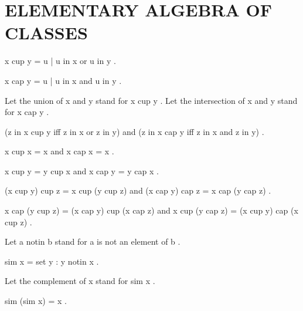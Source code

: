 \documentclass[a4paper,draft]{amsproc}
\begin{document}
\section{ELEMENTARY ALGEBRA OF CLASSES}
\begin{forthel}

\begin{definition} 
 x cup y = {  u | u in x  or  u in y } .
\end{definition}

\begin{definition} 
 x cap y = {  u | u in x  and  u in y } .
\end{definition}

Let the union of  x  and  y  stand for  x cup y .
Let the intersection of  x  and  y  stand for  x cap y .

\begin{theorem}
 (z in x cup y  iff  z in x  or  z in y) 
and  (z in x cap y  iff  z in x  and  z in y) .
\end{theorem}

\begin{theorem}
 x cup x = x  and  x cap x = x .
\end{theorem}

\begin{theorem}
 x cup y = y cup x  and  x cap y = y cap x .
\end{theorem}

\begin{theorem}
 (x cup y) cup z = x cup (y cup z)  
and  (x cap y) cap z = x cap (y cap z) .
\end{theorem}

\begin{theorem}
 x cap (y cup z) = (x cap y) cup (x cap z) 
and  x cup (y cap z) = (x cup y) cap (x cup z) .
\end{theorem}

Let  a notin b  stand for  a  is not an element of  b .

\begin{definition}  sim x = { set  y : y notin x} .\end{definition}
Let the complement of  x  stand for  sim x .

\begin{theorem}
 sim (sim x) = x .
\end{theorem}


\end{forthel}
\end{document}

